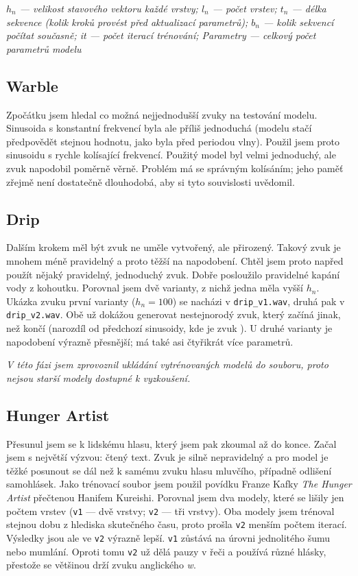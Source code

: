 \documentclass[a4]{article}
\begin{document}
\textit{$h_n$ --- velikost stavového vektoru každé vrstvy; $l_n$ --- počet vrstev; $t_n$ --- délka \textit{sekvence} (kolik kroků provést před aktualizací parametrů); $b_n$ --- kolik sekvencí počítat současně; it --- počet iterací trénování; Parametry --- celkový počet parametrů modelu}
\subsection{Warble}
Zpočátku jsem hledal co možná nejjednodušší zvuky na testování modelu. Sinusoida s konstantní frekvencí byla ale příliš jednoduchá (modelu stačí předpovědět stejnou hodnotu, jako byla před periodou vlny). Použil jsem proto sinusoidu s rychle kolísající frekvencí. Použitý model byl velmi jednoduchý, ale zvuk napodobil poměrně věrně. Problém má se správným kolísáním; jeho paměť zřejmě není dostatečně dlouhodobá, aby si tyto souvislosti uvědomil.

\subsection{Drip}
Dalším krokem měl být zvuk ne uměle vytvořený, ale přirozený. Takový zvuk je mnohem méně pravidelný a proto těžší na napodobení. Chtěl jsem proto napřed použít nějaký pravidelný, jednoduchý zvuk. Dobře posloužilo pravidelné kapání vody z kohoutku. Porovnal jsem dvě varianty, z nichž jedna měla vyšší $h_n$. Ukázka zvuku první varianty ($h_n=100$) se nacházi v \verb|drip_v1.wav|, druhá pak v \verb|drip_v2.wav|. Obě už dokážou generovat nestejnorodý zvuk, který začíná jinak, než končí (narozdíl od předchozí sinusoidy, kde je zvuk ). U druhé varianty je napodobení výrazně přesnější; má také asi čtyřikrát více parametrů.

\textit{V této fázi jsem zprovoznil ukládání vytrénovaných modelů do souboru, proto nejsou starší modely dostupné k vyzkoušení.}
\subsection{Hunger Artist}
Přesunul jsem se k lidskému hlasu, který jsem pak zkoumal až do konce. Začal jsem s největší výzvou: čtený text. Zvuk je silně nepravidelný a pro model je těžké posunout se dál než k samému zvuku hlasu mluvčího, případně odlišení samohlásek. Jako trénovací soubor jsem použil povídku Franze Kafky \textit{The Hunger Artist} přečtenou Hanifem Kureishi. \cite{hungerartist}%
Porovnal jsem dva modely, které se lišily jen počtem vrstev (\verb|v1| --- dvě vrstvy; \verb|v2| --- tři vrstvy). Oba modely jsem trénoval stejnou dobu z hlediska skutečného času, proto prošla \verb|v2| menším počtem iterací. Výsledky jsou ale ve \verb|v2| výrazně lepší. \verb|v1| zůstává na úrovni jednolitého šumu nebo mumlání. Oproti tomu \verb|v2| už dělá pauzy v řeči a používá různé hlásky, přestože se většinou drží zvuku anglického \textit{w}.
\end{document}
